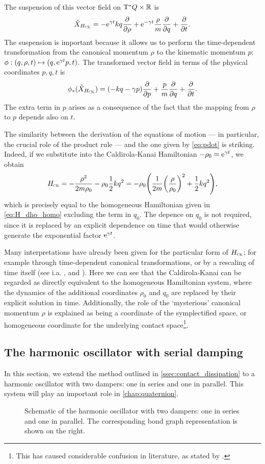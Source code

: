 The suspension of this vector field on $\mathrm{T}^*Q\times \mathbb{R}$ is
$$ \tilde{X}_{H_\text{\tiny{\textsc{CK}}}} = -\mathrm{e}^{\gamma t}kq\pdv{}{\ensuremath{\rho}} + \mathrm{e}^{-\gamma t}\frac{\rho}{m}\pdv{}{q} + \pdv{}{t}.$$
The suspension is important because it allows us to perform the time-dependent transformation from the canonical momentum $\rho$ to the kinematic momentum $p$:
$\phi: (q, \rho, t) \mapsto (q, \mathrm{e}^{\gamma t}p, t).$
The transformed vector field in terms of the physical coordinates $p, q, t$ is
$$ \phi_*(\tilde{X}_{H_\text{\tiny{\textsc{CK}}}}) = \qty(-kq - \gamma p)\pdv{}{p} + \frac{p}{m}\pdv{}{q} + \pdv{}{t}.$$
The extra term in $p$ arises as a consequence of the fact that the mapping from $\rho$ to $p$ depends also on $t$. 

The similarity between the derivation of the equations of motion --- in particular, the crucial role of the product rule --- and the one given by \cref{eq:pdot} is striking. Indeed, if we substitute into the Caldirola-Kanai Hamiltonian $-\rho_0 = \mathrm{e}^{\gamma t}$, we obtain
$$ H_\text{\tiny{\textsc{CK}}} = -\frac{\rho^2}{2m\rho_0} - \rho_0 \frac{1}{2}kq^2 = -\rho_0 \qty (\frac{1}{2m}\qty(\frac{\rho}{\rho_0})^2 + \frac{1}{2}kq^2), $$
which is precisely equal to the homogeneous Hamiltonian given in \cref{eq:H_dho_homo} excluding the term in $q_0$. The depence on $q_0$ is not required, since it is replaced by an explicit dependence on time that would otherwise generate the exponential factor $\mathrm{e}^{\gamma t}$. 

Many interpretations have already been given for the particular form of $H_\text{\tiny{\textsc{CK}}}$; for example through time-dependent canonical transformations, or by a rescaling of time itself (see i.a. \citet{Tokieda2021}, \citet{Caldirola1941} and \citet{Bravetti2017}). Here we can see that the Caldirola-Kanai can be regarded as  directly equivalent to the homogeneous Hamiltonian system, where the dynamics of the additional coordinates $\rho_0$ and $q_0$ are replaced by their explicit solution in time. Additionally, the role of the `mysterious' canonical momentum $\rho$ is explained as being a coordinate of the symplectified space, or homogeneous coordinate for the underlying contact space\footnote{This has caused considerable confusion in literature, as stated by \citet{Schuch1997}.}.

\subsection{The harmonic oscillator with serial damping}
\label{ssec:serial_damping}
In this section, we extend the method outlined in \cref{ssec:contact_dissipation} to a harmonic oscillator with two dampers: one in series and one in parallel. This system will play an important role in \cref{chap:quaternion}.
\begin{figure}[ht!]
    \centering
    
    \caption{Schematic of the harmonic oscillator with two dampers: one in series and one in parallel. The corresponding bond graph representation is shown on the right.}
    \label{fig:double_damped_osc}
\end{figure}

